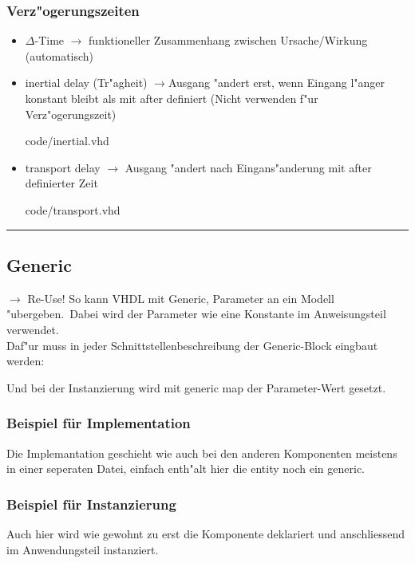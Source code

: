 			
			\begin{minipage}{0.49\textwidth}
			\subsubsection{Verz"ogerungszeiten}  %
				\begin{itemize}
				\itemsep0em
					\item $\Delta$-Time $\rightarrow$ funktioneller Zusammenhang 
						zwischen Ursache/Wirkung (automatisch)
					\item inertial delay (Tr"agheit) $\rightarrow$Ausgang "andert erst, 
						wenn Eingang l"anger konstant bleibt als mit after definiert 
						(Nicht verwenden f"ur Verz"ogerungszeit)
						
							{code/inertial.vhd}
					\item transport delay $\rightarrow$ Ausgang "andert nach 
						Eingans"anderung mit after definierter Zeit 
						
							{code/transport.vhd}
				\end{itemize}
			\end{minipage}
			\hfill
			\begin{minipage}{0.49\textwidth}
			
			\end{minipage}
			
			\hrule
		\begin{multicols}{2}
	\subsection{Generic}
		$\rightarrow$ Re-Use! So kann VHDL mit Generic, Parameter an ein Modell 
		"ubergeben.\ Dabei wird der Parameter wie eine Konstante im Anweisungsteil 
		verwendet.\\
		Daf"ur muss in jeder Schnittstellenbeschreibung der Generic-Block eingbaut werden:
		
		Und bei der Instanzierung wird mit generic map der Parameter-Wert gesetzt.

\vfill\null
\columnbreak
			\subsubsection{Beispiel für Implementation}
				Die Implemantation geschieht wie auch bei den anderen 
				Komponenten meistens in einer seperaten Datei, einfach enth"alt hier die 
				entity noch ein generic.
				
			\subsubsection{Beispiel für Instanzierung}
				Auch hier wird wie gewohnt zu erst die Komponente deklariert und 
				anschliessend im Anwendungsteil instanziert.
				
		\end{multicols}
